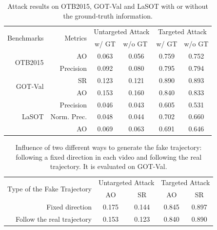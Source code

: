 \documentclass[journal]{IEEEtran}
\renewcommand{\uline}{}
\begin{document}
\begin{table}[t]
  \centering
  \caption{Attack results on OTB2015, GOT-Val and LaSOT with or without the \uline{ground-truth} information.}
  \begin{tabular}{rrcccc}
  \toprule
  \multirow{2}{*}[-2pt]{Benchmarks} & \multirow{2}{*}[-2pt]{Metrics} & \multicolumn{2}{c}{Untargeted Attack} & \multicolumn{2}{c}{Targeted Attack} \\ \cmidrule{3-6}
                              &                          & w/ GT  & \multicolumn{1}{l}{w/o GT}  & w/ GT  & \multicolumn{1}{l}{w/o GT} \\ \midrule
  \multirow{2}{*}{OTB2015}     & AO                       & 0.063  & 0.056                       & 0.759  & 0.752                      \\
                              & Precision                & 0.092  & 0.080                       & 0.795  & 0.794                      \\ \midrule
  \multirow{2}{*}{GOT-Val}    & SR                       & 0.123  & 0.121                       & 0.890  & 0.893                      \\
                              & AO                       & 0.153  & 0.160                       & 0.840  & 0.833                      \\ \midrule
  \multirow{3}{*}{LaSOT}      & Precision                & 0.046  & 0.043                       & 0.605  & 0.531                      \\
                              & Norm. Prec.              & 0.048  & 0.044                       & 0.702  & 0.660                      \\
                              & AO                       & 0.069  & 0.063                       & 0.691  & 0.646                      \\ \bottomrule
  \end{tabular}
  \label{tab:agent_GT}
\end{table}
\begin{table}[t]
  \centering
  \caption{Influence of two different ways to generate the fake trajectory: following a fixed direction in each video and following the real trajectory. It is evaluated on GOT-Val.}
  \begin{tabular}{@{}rcccc@{}}
  \toprule
  \multirow{2}{*}[-2pt]{Type of the Fake Trajectory} & \multicolumn{2}{c}{Untargeted Attack} & \multicolumn{2}{c}{Targeted Attack} \\ \cmidrule{2-5}
                              & AO                & SR                & AO               & SR               \\ \midrule
  Fixed direction             & 0.175             & 0.144             & 0.845            & 0.897            \\
  Follow the real trajectory  & 0.153             & 0.123             & 0.840            & 0.890            \\ \bottomrule        
  \end{tabular}
  \vspace{-3mm}
  \label{table:direction}
\end{table}
\end{document}

